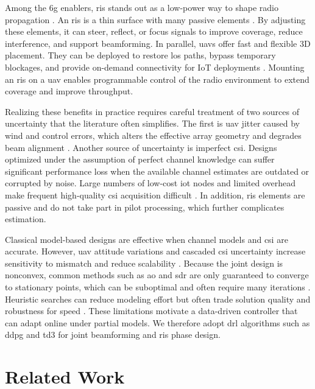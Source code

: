 \documentclass[letterpaper,journal]{IEEEtran}
\begin{document}
Among the \gls{6g} enablers, \gls{ris} stands out as a low-power way to shape radio propagation \cite{salim2025cooperative}. An \gls{ris} is a thin surface with many passive elements \cite{bjornson2022spm}. By adjusting these elements, it can steer, reflect, or focus signals to improve coverage, reduce interference, and support beamforming. In parallel, \glspl{uav} offer fast and flexible 3D placement. They can be deployed to restore \gls{los} paths, bypass temporary blockages, and provide on-demand connectivity for IoT deployments \cite{cheng2023ai}. Mounting an \gls{ris} on a \gls{uav} enables programmable control of the radio environment to extend coverage and improve throughput.

Realizing these benefits in practice requires careful treatment of two sources of uncertainty that the literature often simplifies. The first is \gls{uav} jitter caused by wind and control errors, which alters the effective array geometry and degrades beam alignment \cite{yuan2020jittering}. Another source of uncertainty is imperfect \gls{csi}. Designs optimized under the assumption of perfect channel knowledge can suffer significant performance loss when the available channel estimates are outdated or corrupted by noise. Large numbers of low-cost \gls{iot} nodes and limited overhead make frequent high-quality \gls{csi} acquisition difficult \cite{zheng2022survey}. In addition, \gls{ris} elements are passive and do not take part in pilot processing, which further complicates estimation.

Classical model-based designs are effective when channel models and \gls{csi} are accurate. However, \gls{uav} attitude variations and cascaded \gls{csi} uncertainty increase sensitivity to mismatch and reduce scalability \cite{shamasundar2023channel}. Because the joint design is nonconvex, common methods such as \gls{ao} and \gls{sdr} are only guaranteed to converge to stationary points, which can be suboptimal and often require many iterations \cite{wu2021tutorial}. Heuristic searches can reduce modeling effort but often trade solution quality and robustness for speed \cite{zhou2023survey}. These limitations motivate a data-driven controller that can adapt online under partial models. We therefore adopt \gls{drl} algorithms such as \gls{ddpg} and \gls{td3} for joint beamforming and \gls{ris} phase design.


\section{Related Work}
\label{sec:related_work}
\end{document}
